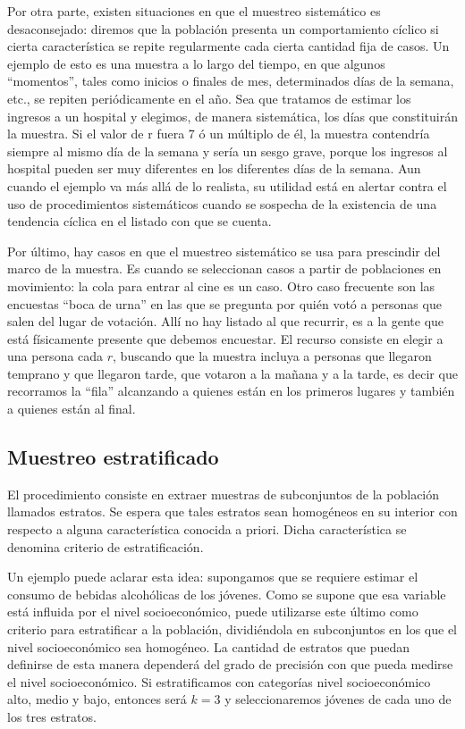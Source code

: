 \documentclass[]{book}
\begin{document}
Por otra parte, existen situaciones en que el muestreo sistemático es
desaconsejado: diremos que la población presenta un comportamiento
cíclico si cierta característica se repite regularmente cada cierta
cantidad fija de casos. Un ejemplo de esto es una muestra a lo largo del
tiempo, en que algunos ``momentos'', tales como inicios o finales de mes,
determinados días de la semana, etc., se repiten periódicamente en el
año. Sea que tratamos de estimar los ingresos a un hospital y elegimos, de manera sistemática, los días que constituirán la muestra. Si el valor de r fuera 7 ó un múltiplo de él, la muestra contendría siempre al mismo día de la semana y sería un sesgo grave, porque los ingresos al hospital pueden ser muy diferentes en los diferentes días de la semana. Aun cuando el ejemplo va más allá de lo realista, su utilidad está en alertar contra el uso de procedimientos sistemáticos cuando se sospecha de la existencia de una tendencia cíclica en el listado con que se cuenta.

Por último, hay casos en que el muestreo sistemático se usa para
prescindir del marco de la muestra. Es cuando se seleccionan casos a
partir de poblaciones en movimiento: la cola para entrar al cine es un
caso. Otro caso frecuente son las encuestas ``boca de urna'' en las que se
pregunta por quién votó a personas que salen del lugar de votación. Allí
no hay listado al que recurrir, es a la gente que está físicamente
presente que debemos encuestar. El recurso consiste en elegir a una
persona cada \(r\), buscando que la muestra incluya a personas que llegaron temprano y que llegaron tarde, que votaron a la mañana y a la tarde, es decir que recorramos la ``fila'' alcanzando a quienes están en los primeros lugares y también a quienes están al final.

\hypertarget{muestreo-estratificado}{%
\subsection{Muestreo estratificado}\label{muestreo-estratificado}}

El procedimiento consiste en extraer muestras de subconjuntos de la
población llamados estratos. Se espera que tales estratos sean
homogéneos en su interior con respecto a alguna característica conocida
a priori. Dicha característica se denomina criterio de estratificación.

Un ejemplo puede aclarar esta idea: supongamos que se requiere estimar
el consumo de bebidas alcohólicas de los jóvenes. Como se supone que esa
variable está influida por el nivel socioeconómico, puede utilizarse
este último como criterio para estratificar a la población, dividiéndola
en subconjuntos en los que el nivel socioeconómico sea homogéneo. La
cantidad de estratos que puedan definirse de esta manera dependerá del
grado de precisión con que pueda medirse el nivel socioeconómico. Si
estratificamos con categorías nivel socioeconómico alto, medio y bajo,
entonces será \(k=3\) y seleccionaremos jóvenes de cada uno de los tres
estratos.
\end{document}
